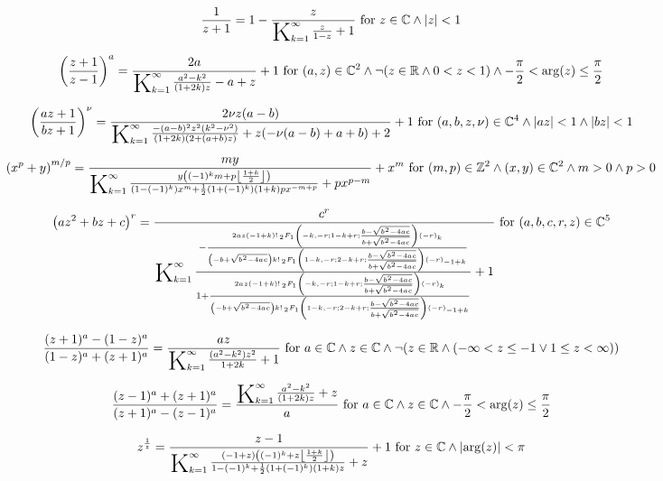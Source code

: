\documentclass{article}
\newcommand{\bigK}{\mathop{\raisebox{-5pt}{\huge K}}}
\begin{document}
\[\frac{1}{z+1}=1-\frac{z}{\bigK_{k=1}^{\infty}\frac{z}{1-z}+1}\text{ for }z\in \mathbb{C}\land \left| z\right| <1\] 

\[\left(\frac{z+1}{z-1}\right)^a=\frac{2 a}{\bigK_{k=1}^{\infty}\frac{a^2-k^2}{(1+2 k) z}-a+z}+1\text{ for }(a,z)\in \mathbb{C}^2\land \neg (z\in \mathbb{R}\land 0<z<1)\land -\frac{\pi }{2}<\arg (z)\leq \frac{\pi }{2}\] 

\[\left(\frac{a z+1}{b z+1}\right)^{\nu }=\frac{2 \nu  z (a-b)}{\bigK_{k=1}^{\infty}\frac{-(a-b)^2 z^2 \left(k^2-\nu ^2\right)}{(1+2 k) (2+(a+b) z)}+z (-\nu  (a-b)+a+b)+2}+1\text{ for }(a,b,z,\nu )\in \mathbb{C}^4\land \left| a z\right| <1\land \left| b z\right| <1\] 

\[\left(x^p+y\right)^{m/p}=\frac{m y}{\bigK_{k=1}^{\infty}\frac{y \left((-1)^k m+p \left\lfloor \frac{1+k}{2}\right\rfloor \right)}{\left(1-(-1)^k\right) x^m+\frac{1}{2} \left(1+(-1)^k\right) (1+k) p x^{-m+p}}+p x^{p-m}}+x^m\text{ for }(m,p)\in \mathbb{Z}^2\land (x,y)\in \mathbb{C}^2\land m>0\land p>0\] 

\[\left(a z^2+b z+c\right)^r=\frac{c^r}{\bigK_{k=1}^{\infty}\frac{-\frac{2 a z (-1+k)! \, _2F_1\left(-k,-r;1-k+r;\frac{b-\sqrt{b^2-4 a c}}{b+\sqrt{b^2-4 a c}}\right) (-r)_k}{\left(-b+\sqrt{b^2-4 a c}\right) k! \, _2F_1\left(1-k,-r;2-k+r;\frac{b-\sqrt{b^2-4 a c}}{b+\sqrt{b^2-4 a c}}\right) (-r)_{-1+k}}}{1+\frac{2 a z (-1+k)! \, _2F_1\left(-k,-r;1-k+r;\frac{b-\sqrt{b^2-4 a c}}{b+\sqrt{b^2-4 a c}}\right) (-r)_k}{\left(-b+\sqrt{b^2-4 a c}\right) k! \, _2F_1\left(1-k,-r;2-k+r;\frac{b-\sqrt{b^2-4 a c}}{b+\sqrt{b^2-4 a c}}\right) (-r)_{-1+k}}}+1}\text{ for }(a,b,c,r,z)\in \mathbb{C}^5\] 

\[\frac{(z+1)^a-(1-z)^a}{(1-z)^a+(z+1)^a}=\frac{a z}{\bigK_{k=1}^{\infty}\frac{\left(a^2-k^2\right) z^2}{1+2 k}+1}\text{ for }a\in \mathbb{C}\land z\in \mathbb{C}\land \neg (z\in \mathbb{R}\land (-\infty <z\leq -1\lor 1\leq z<\infty ))\] 

\[\frac{(z-1)^a+(z+1)^a}{(z+1)^a-(z-1)^a}=\frac{\bigK_{k=1}^{\infty}\frac{a^2-k^2}{(1+2 k) z}+z}{a}\text{ for }a\in \mathbb{C}\land z\in \mathbb{C}\land -\frac{\pi }{2}<\arg (z)\leq \frac{\pi }{2}\] 

\[z^{\frac{1}{z}}=\frac{z-1}{\bigK_{k=1}^{\infty}\frac{(-1+z) \left((-1)^k+z \left\lfloor \frac{1+k}{2}\right\rfloor \right)}{1-(-1)^k+\frac{1}{2} \left(1+(-1)^k\right) (1+k) z}+z}+1\text{ for }z\in \mathbb{C}\land \left| \arg (z)\right| <\pi\] 
\end{document}
